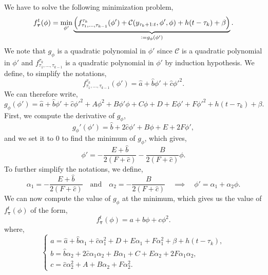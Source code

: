 \documentclass[11pt]{article}
\begin{document}
We have to solve the following minimization problem,
\begin{equation}
    f_{\boldsymbol{\tau}}^t(\phi) = \min_{\phi'}\underbrace{\left(f^{\tau_k}_{\tau_1,\dots,\tau_{k-1}}(\phi')+\mathcal{C}(y_{\tau_k+1:t},\phi',\phi)+h(t-\tau_k)+\beta\right)}_{\vcentcolon = g_\phi(\phi')}.
\end{equation}
We note that $g_\phi$ is a quadratic polynomial in $\phi'$ since $\mathcal{C}$ is a quadratic polynomial in $\phi'$ and $f^{\tau_k}_{\tau_1,\dots,\tau_{k-1}}$ is a quadratic polynomial in $\phi'$ by induction hypothesis. We define, to simplify the notations,
\begin{equation*}
    f^{\tau_k}_{\tau_1,\dots,\tau_{k-1}}(\phi') = \hat{a} + \hat{b}\phi' + \hat{c}{\phi'}^2.
\end{equation*}
We can therefore write,
\begin{equation*}
    g_\phi(\phi') = \hat{a} + \hat{b}\phi' + \hat{c}{\phi'}^2 + A\phi^2+B\phi'\phi + C\phi + D + E\phi'+F{\phi'}^2 + h(t-\tau_k)+\beta.
\end{equation*}
First, we compute the derivative of $g_\phi$,
\begin{equation*}
    g_\phi'(\phi') = \hat{b} + 2\hat{c}\phi' + B\phi + E + 2F\phi',
\end{equation*}
and we set it to $0$ to find the minimum of $g_\phi$, which gives,
\begin{equation*}
    \phi' = -\frac{E + \hat{b}}{2(F+\hat{c})} - \frac{B}{2(F+\hat{c})}\phi.
\end{equation*}
To further simplify the notations, we define,
\begin{equation*}
    \alpha_1 = -\frac{E + \hat{b}}{2(F+\hat{c})} \quad \text{and} \quad \alpha_2 = - \frac{B}{2(F+\hat{c})} \quad \implies \quad \phi' = \alpha_1 + \alpha_2\phi.
\end{equation*}
We can now compute the value of $g_\phi$ at the minimum, which gives us the value of $f_{\boldsymbol{\tau}}^t(\phi)$ of the form,
$$ f_{\boldsymbol{\tau}}^t(\phi) = a + b\phi + c\phi^2. $$
where,
\begin{equation*}
    \begin{cases}
        a = \hat{a} + \hat{b}\alpha_1 + \hat{c}\alpha_1^2 + D + E\alpha_1 + F\alpha_1^2 + \beta + h(t-\tau_k), \\
        b = \hat{b}\alpha_2 + 2\hat{c}\alpha_1\alpha_2 + B\alpha_1 + C + E\alpha_2 + 2F\alpha_1\alpha_2,       \\
        c = \hat{c}\alpha_2^2 + A + B\alpha_2 + F\alpha_2^2.
    \end{cases}
\end{equation*}
\end{document}
